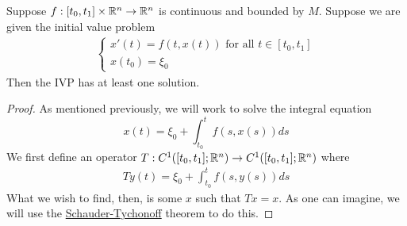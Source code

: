\begin{theorem}\label{thm:cau-pen}
Suppose $f: [t_0, t_1] \times \mathbb{R}^n \to \mathbb{R}^n$ is continuous and bounded by $M$. Suppose we are given the initial value problem 
\begin{align*}
    \begin{cases}
    x'(t) = f(t, x(t)) \text{ for all } t \in [t_0, t_1]\\
    x(t_0) = \xi_0
    \end{cases}
\end{align*}
Then the IVP has at least one solution.
\end{theorem}
\begin{proof}
As mentioned previously, we will work to solve the integral equation
$$ x(t) = \xi_0 + \int_{t_0}^{t} f(s, x(s)) ds $$
We first define an operator $T: C^1([t_0, t_1]; \mathbb{R}^n) \to C^1([t_0, t_1]; \mathbb{R}^n)$ where
\begin{align*}
    Ty(t) = \xi_0 + \int_{t_0}^{t} f(s, y(s)) ds
\end{align*}
What we wish to find, then, is some $x$ such that $Tx = x$. As one can imagine, we will use the \hyperref[thm:sch-tyc-thm]{Schauder-Tychonoff} theorem to do this.


\end{proof}
